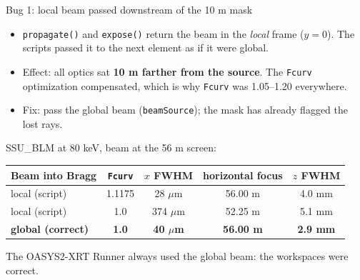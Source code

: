 \documentclass[aspectratio=169,10pt]{beamer}
\begin{document}
\begin{frame}{Bug 1: local beam passed downstream of the 10 m mask}
  \small
  \begin{itemize}
    \item \texttt{propagate()} and \texttt{expose()} return the beam in the
      \emph{local} frame ($y=0$). The scripts passed it to the next element as if it were global.
    \item Effect: all optics sat \textbf{10 m farther from the source}. The
      \texttt{Fcurv} optimization compensated, which is why \texttt{Fcurv} was 1.05--1.20 everywhere.
    \item Fix: pass the global beam (\texttt{beamSource}); the mask has already flagged the lost rays.
  \end{itemize}

  \vspace{0.5em}
  \centering
  SSU\_BLM at 80 keV, beam at the 56 m screen:\\[0.3em]
  \begin{tabular}{@{}lcccc@{}}
    \toprule
    Beam into Bragg & \texttt{Fcurv} & $x$ FWHM & horizontal focus & $z$ FWHM \\
    \midrule
    local (script)        & 1.1175 & 28 $\mu$m  & 56.00 m & 4.0 mm \\
    local (script)        & 1.0    & 374 $\mu$m & 52.25 m & 5.1 mm \\
    \textbf{global (correct)} & \textbf{1.0} & \textbf{40 $\mu$m} & \textbf{56.00 m} & \textbf{2.9 mm} \\
    \bottomrule
  \end{tabular}

  \vspace{0.5em}
  \raggedright
  The OASYS2-XRT Runner always used the global beam: the workspaces were correct.
\end{frame}
\end{document}
